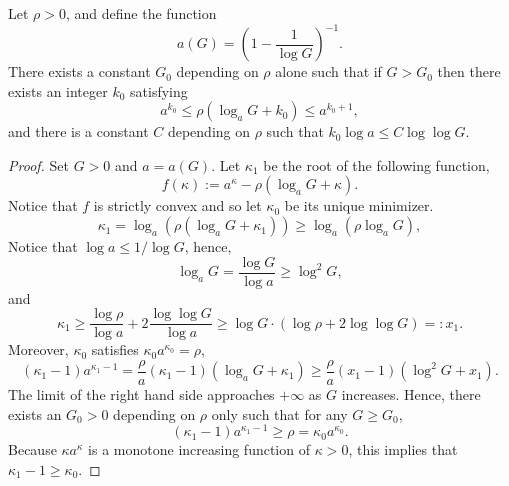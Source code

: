 \begin{lemma}
\label{lem:k0exists}
Let $\rho > 0$, and define the function 
\begin{equation}
    a(G) = \left( 1 - \frac{1}{\log G} \right)^{-1}.
\end{equation}
There exists a constant $G_0$ depending on $\rho$ alone such that if $G > G_0$ then there exists an integer $k_0$ satisfying
\begin{equation}
    a^{k_0} \le \rho (\log_a G + k_0) \le a^{k_0 + 1},
\end{equation}
and there is a constant $C$ depending on $\rho$ such that $k_0 \log a \le C \log \log G$.
\end{lemma}

\begin{proof}
Set $G > 0$ and $a = a(G)$.
Let $\kappa_1$ be the root of the following function,
\begin{equation*}
    f(\kappa) := a^{\kappa} - \rho ( \log_a G + \kappa ).
\end{equation*}
Notice that $f$ is strictly convex and so let $\kappa_0$ be its unique minimizer.
\begin{equation*}
    \kappa_1 = \log_a \left( \rho (\log_a G + \kappa_1 ) \right) \ge \log_a \left( \rho \log_a G \right),
\end{equation*}
Notice that $\log a \le 1/\log G$, hence,
\begin{equation*}
    \log_a G = \frac{\log G}{\log a} \ge \log^2 G,
\end{equation*}
and
\begin{equation*}
    \kappa_1 \ge \frac{\log \rho}{\log a} + 2 \frac{\log \log G}{\log a} \ge \log G \cdot (\log \rho + 2 \log \log G) =: x_1.
\end{equation*}
Moreover, $\kappa_0$ satisfies $\kappa_0 a^{\kappa_0} = \rho$,
\begin{equation*}
    (\kappa_1 - 1) a^{\kappa_1 - 1} =  \frac{\rho}{a} (\kappa_1 - 1)(\log_a G + \kappa_1) \ge  \frac{\rho}{a} (x_1 - 1) (\log^2 G + x_1).
\end{equation*}
The limit of the right hand side approaches $+\infty$ as $G$ increases.
Hence, there exists an $G_0 > 0$ depending on $\rho$ only such that for any $G \ge G_0$,
\begin{equation*}
    (\kappa_1 - 1) a^{\kappa_1 - 1} \ge \rho = \kappa_0 a^{\kappa_0}.
\end{equation*}
Because $\kappa a^\kappa$ is a monotone increasing function of $\kappa > 0$, this implies that $\kappa_1 - 1\ge \kappa_0$.


\end{proof}
